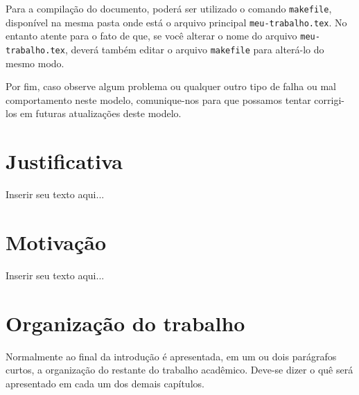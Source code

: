 Para a compilação do documento, poderá ser utilizado o comando \verb|makefile|, disponível na mesma pasta onde está o arquivo principal \verb|meu-trabalho.tex|.
No entanto atente para o fato de que, se você alterar o nome do arquivo \verb|meu-trabalho.tex|, deverá também editar o arquivo \verb|makefile| para alterá-lo do mesmo modo.

Por fim, caso observe algum problema ou qualquer outro tipo de falha ou mal comportamento neste modelo, comunique-nos para que possamos tentar corrigi-los em futuras atualizações deste modelo.

\section{Justificativa}
\label{sec:justificativa}

Inserir seu texto aqui...

\section{Motivação}
\label{sec:motivacao}

Inserir seu texto aqui...

\section{Organização do trabalho}
\label{sec:organizacao_trabalho}

Normalmente ao final da introdução é apresentada, em um ou dois parágrafos curtos, a organização do restante do trabalho acadêmico.
Deve-se dizer o quê será apresentado em cada um dos demais capítulos.
